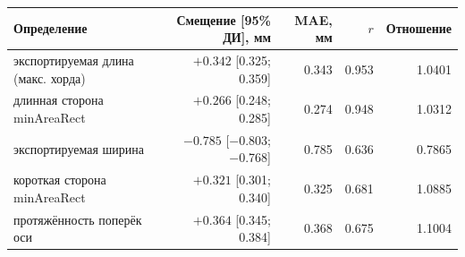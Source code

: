 \begin{tabular}{@{}lrrrr@{}}
\toprule
Определение & Смещение [95\% ДИ], мм & MAE, мм & $r$ & Отношение \\
\midrule
экспортируемая длина (макс. хорда) & $+\num{0.342}$ [\num{0.325}; \num{0.359}] & \num{0.343} & \num{0.953} & \num{1.0401} \\
длинная сторона minAreaRect & $+\num{0.266}$ [\num{0.248}; \num{0.285}] & \num{0.274} & \num{0.948} & \num{1.0312} \\
экспортируемая ширина & $-\num{0.785}$ [\num{-0.803}; \num{-0.768}] & \num{0.785} & \num{0.636} & \num{0.7865} \\
короткая сторона minAreaRect & $+\num{0.321}$ [\num{0.301}; \num{0.340}] & \num{0.325} & \num{0.681} & \num{1.0885} \\
протяжённость поперёк оси & $+\num{0.364}$ [\num{0.345}; \num{0.384}] & \num{0.368} & \num{0.675} & \num{1.1004} \\
\bottomrule
\end{tabular}
